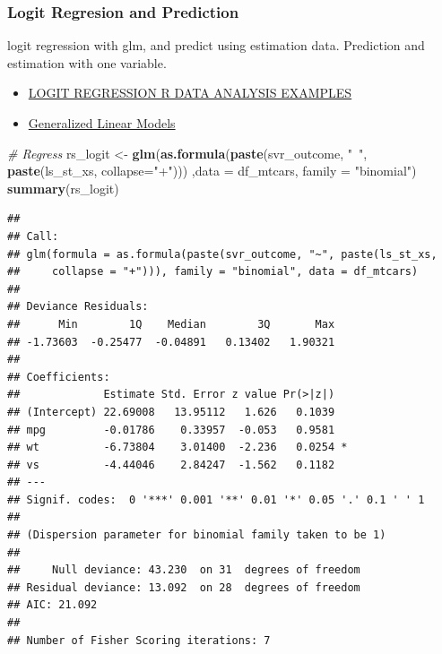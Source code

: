 \documentclass[
]{book}
\newenvironment{Shaded}{\begin{snugshade}}{\end{snugshade}}
\newcommand{\CommentTok}[1]{\textcolor[rgb]{0.56,0.35,0.01}{\textit{#1}}}
\newcommand{\DataTypeTok}[1]{\textcolor[rgb]{0.13,0.29,0.53}{#1}}
\newcommand{\KeywordTok}[1]{\textcolor[rgb]{0.13,0.29,0.53}{\textbf{#1}}}
\newcommand{\NormalTok}[1]{#1}
\newcommand{\StringTok}[1]{\textcolor[rgb]{0.31,0.60,0.02}{#1}}
\providecommand{\tightlist}{%
  \setlength{\itemsep}{0pt}\setlength{\parskip}{0pt}}
\begin{document}
\hypertarget{logit-regresion-and-prediction}{%
\subsubsection{Logit Regresion and Prediction}\label{logit-regresion-and-prediction}}

logit regression with glm, and predict using estimation data. Prediction and estimation with one variable.

\begin{itemize}
\tightlist
\item
  \href{https://stats.idre.ucla.edu/r/dae/logit-regression/}{LOGIT REGRESSION R DATA ANALYSIS EXAMPLES}
\item
  \href{https://www.statmethods.net/advstats/glm.html}{Generalized Linear Models}
\end{itemize}

\begin{Shaded}
\begin{Highlighting}[]
\CommentTok{# Regress}
\NormalTok{rs_logit <-}\StringTok{ }\KeywordTok{glm}\NormalTok{(}\KeywordTok{as.formula}\NormalTok{(}\KeywordTok{paste}\NormalTok{(svr_outcome, }\StringTok{"~"}\NormalTok{, }\KeywordTok{paste}\NormalTok{(ls_st_xs, }\DataTypeTok{collapse=}\StringTok{"+"}\NormalTok{)))}
\NormalTok{                ,}\DataTypeTok{data =}\NormalTok{ df_mtcars, }\DataTypeTok{family =} \StringTok{"binomial"}\NormalTok{)}
\KeywordTok{summary}\NormalTok{(rs_logit)}
\end{Highlighting}
\end{Shaded}

\begin{verbatim}
## 
## Call:
## glm(formula = as.formula(paste(svr_outcome, "~", paste(ls_st_xs, 
##     collapse = "+"))), family = "binomial", data = df_mtcars)
## 
## Deviance Residuals: 
##      Min        1Q    Median        3Q       Max  
## -1.73603  -0.25477  -0.04891   0.13402   1.90321  
## 
## Coefficients:
##             Estimate Std. Error z value Pr(>|z|)  
## (Intercept) 22.69008   13.95112   1.626   0.1039  
## mpg         -0.01786    0.33957  -0.053   0.9581  
## wt          -6.73804    3.01400  -2.236   0.0254 *
## vs          -4.44046    2.84247  -1.562   0.1182  
## ---
## Signif. codes:  0 '***' 0.001 '**' 0.01 '*' 0.05 '.' 0.1 ' ' 1
## 
## (Dispersion parameter for binomial family taken to be 1)
## 
##     Null deviance: 43.230  on 31  degrees of freedom
## Residual deviance: 13.092  on 28  degrees of freedom
## AIC: 21.092
## 
## Number of Fisher Scoring iterations: 7
\end{verbatim}
\end{document}
